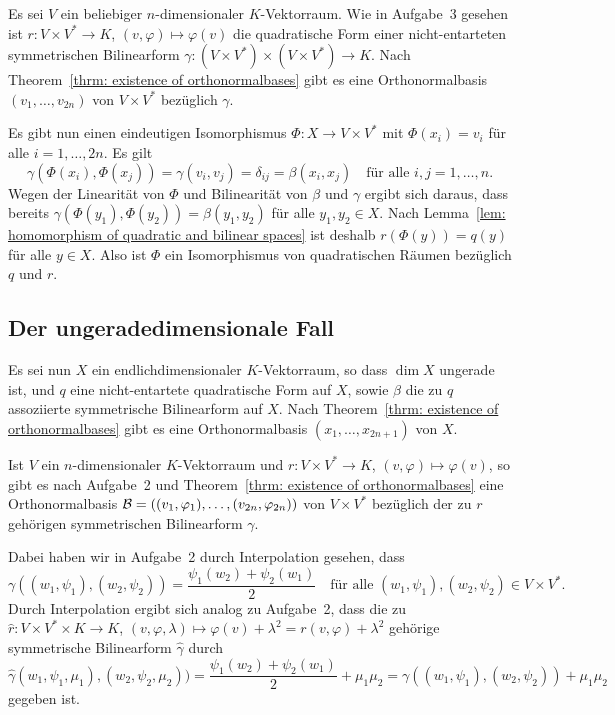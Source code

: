 \documentclass[a4paper,10pt,numbers=noenddot]{scrartcl}
\begin{document}
Es sei $V$ ein beliebiger $n$-dimensionaler $K$-Vektorraum.
Wie in Aufgabe~3 gesehen ist $r \colon V \times V^* \to K$, $(v,\varphi) \mapsto \varphi(v)$ die quadratische Form einer nicht-entarteten symmetrischen Bilinearform $\gamma \colon (V \times V^*) \times (V \times V^*) \to K$.
Nach Theorem~\ref{thrm: existence of orthonormalbases} gibt es eine Orthonormalbasis $(v_1, \dotsc, v_{2n})$ von $V \times V^*$ bezüglich $\gamma$.

Es gibt nun einen eindeutigen Isomorphismus $\Phi \colon X \to V \times V^*$ mit $\Phi(x_i) = v_i$ für alle $i = 1, \dotsc, 2n$.
Es gilt
\[
  \gamma(\Phi(x_i), \Phi(x_j)) = \gamma(v_i, v_j) = \delta_{ij} = \beta(x_i, x_j)
  \quad
  \text{für alle $i, j = 1, \dotsc, n$}.
\]
Wegen der Linearität von $\Phi$ und Bilinearität von $\beta$ und $\gamma$ ergibt sich daraus, dass bereits $\gamma(\Phi(y_1), \Phi(y_2)) = \beta(y_1, y_2)$ für alle $y_1, y_2 \in X$.
Nach Lemma~\ref{lem: homomorphism of quadratic and bilinear spaces} ist deshalb $r(\Phi(y)) = q(y)$ für alle $y \in X$.
Also ist $\Phi$ ein Isomorphismus von quadratischen Räumen bezüglich $q$ und $r$.





\subsection{Der ungeradedimensionale Fall}

Es sei nun $X$ ein endlichdimensionaler $K$-Vektorraum, so dass $\dim X$ ungerade ist, und $q$ eine nicht-entartete quadratische Form auf $X$, sowie $\beta$ die zu $q$ assoziierte symmetrische Bilinearform auf $X$.
Nach Theorem~\ref{thrm: existence of orthonormalbases} gibt es eine Orthonormalbasis $(x_1, \dotsc, x_{2n+1})$ von $X$.

Ist $V$ ein $n$-dimensionaler $K$-Vektorraum und $r \colon V \times V^* \to K$, $(v, \varphi) \mapsto \varphi(v)$, so gibt es nach Aufgabe~2 und Theorem~\ref{thrm: existence of orthonormalbases} eine Orthonormalbasis $\mathcal{B} = ((v_1, \varphi_1), \dotsc, (v_{2n}, \varphi_{2n}))$ von $V \times V^*$ bezüglich der zu $r$ gehörigen symmetrischen Bilinearform $\gamma$.

Dabei haben wir in Aufgabe~2 durch Interpolation gesehen, dass
\[
    \gamma((w_1, \psi_1), (w_2, \psi_2))
  = \frac{\psi_1(w_2) + \psi_2(w_1)}{2}
  \quad
  \text{für alle $(w_1, \psi_1), (w_2, \psi_2) \in V \times V^*$}.
\]
Durch Interpolation ergibt sich analog zu Aufgabe~2, dass die zu $\hat{r} \colon V \times V^* \times K \to K$, $(v, \varphi, \lambda) \mapsto \varphi(v) + \lambda^2 = r(v, \varphi) + \lambda^2$ gehörige symmetrische Bilinearform $\hat{\gamma}$ durch
\[
    \hat{\gamma}(w_1, \psi_1, \mu_1), (w_2, \psi_2, \mu_2))
  = \frac{\psi_1(w_2) + \psi_2(w_1)}{2} + \mu_1 \mu_2
  = \gamma((w_1, \psi_1), (w_2, \psi_2)) + \mu_1 \mu_2
\]
gegeben ist.
\end{document}
